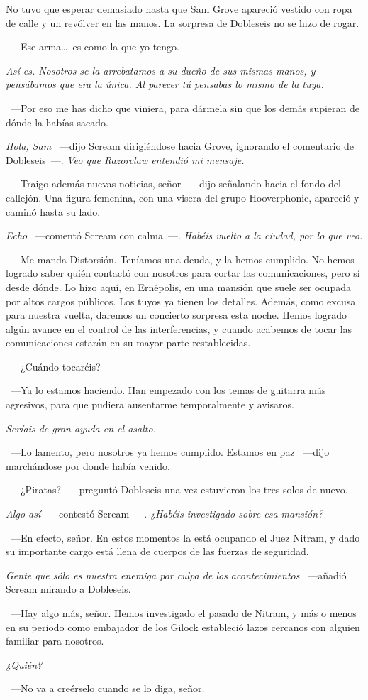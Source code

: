 No tuvo que esperar demasiado hasta que Sam Grove apareció vestido con ropa de calle y un revólver en las manos. La sorpresa de Dobleseis no se hizo de rogar.

~---Ese arma\dots\ es como la que yo tengo.

\emph{Así es. Nosotros se la arrebatamos a su dueño de sus mismas manos, y pensábamos que era la única. Al parecer tú pensabas lo mismo de la tuya.}

~---Por eso me has dicho que viniera, para dármela sin que los demás supieran de dónde la habías sacado.

\emph{Hola, Sam} ~---dijo Scream dirigiéndose hacia Grove, ignorando el comentario de Dobleseis~---. \emph{Veo que Razorclaw entendió mi mensaje.}

~---Traigo además nuevas noticias, señor ~---dijo señalando hacia el fondo del callejón. Una figura femenina, con una visera del grupo Hooverphonic, apareció y caminó hasta su lado.

\emph{Echo} ~---comentó Scream con calma~---. \emph{Habéis vuelto a la ciudad, por lo que veo.}

~---Me manda Distorsión. Teníamos una deuda, y la hemos cumplido. No hemos logrado saber quién contactó con nosotros para cortar las comunicaciones, pero sí desde dónde. Lo hizo aquí, en Ernépolis, en una mansión que suele ser ocupada por altos cargos públicos. Los tuyos ya tienen los detalles. Además, como excusa para nuestra vuelta, daremos un concierto sorpresa esta noche. Hemos logrado algún avance en el control de las interferencias, y cuando acabemos de tocar las comunicaciones estarán en su mayor parte restablecidas.

~---¿Cuándo tocaréis?

~---Ya lo estamos haciendo. Han empezado con los temas de guitarra más agresivos, para que pudiera ausentarme temporalmente y avisaros.

\emph{Seríais de gran ayuda en el asalto.}

~---Lo lamento, pero nosotros ya hemos cumplido. Estamos en paz ~---dijo marchándose por donde había venido.

~---¿Piratas? ~---preguntó Dobleseis una vez estuvieron los tres solos de nuevo.

\emph{Algo así} ~---contestó Scream~---. \emph{¿Habéis investigado sobre esa mansión?}

~---En efecto, señor. En estos momentos la está ocupando el Juez Nitram, y dado su importante cargo está llena de cuerpos de las fuerzas de seguridad.

\emph{Gente que sólo es nuestra enemiga por culpa de los acontecimientos} ~---añadió Scream mirando a Dobleseis.

~---Hay algo más, señor. Hemos investigado el pasado de Nitram, y más o menos en su periodo como embajador de los Gilock estableció lazos cercanos con alguien familiar para nosotros.

\emph{¿Quién?}

~---No va a creérselo cuando se lo diga, señor.

\endinput
